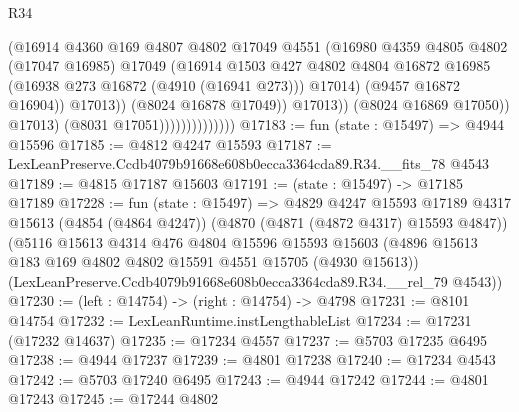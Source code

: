 \begin{lexlean}{R34}
\begin{coremodule}
                                          (@16914
                                            @4360
                                            @169
                                            @4807
                                            @4802
                                            @17049
                                            @4551
                                            (@16980
                                              @4359
                                              @4805
                                              @4802
                                              (@17047 @16985)
                                              @17049
                                              (@16914
                                                @1503
                                                @427
                                                @4802
                                                @4804
                                                @16872
                                                @16985
                                                (@16938 @273 @16872 (@4910 (@16941 @273)))
                                                @17014)
                                              (@9457 @16872 @16904))
                                            @17013))
                                        (@8024 @16878 @17049))
                                      @17013))
                                  (@8024 @16869 @17050))
                                @17013)
                              (@8031 @17051))))))))))))))
@17183 := fun (state : @15497) => @4944 @15596
@17185 := @4812 @4247 @15593
@17187 := LexLeanPreserve.Ccdb4079b91668e608b0ecca3364cda89.R34.__fits_78 @4543
@17189 := @4815 @17187 @15603
@17191 := (state : @15497) -> @17185 @17189
@17228 := fun (state : @15497) =>
  @4829
    @4247
    @15593
    @17189
    @4317
    @15613
    (@4854 (@4864 @4247))
    (@4870 (@4871 (@4872 @4317) @15593 @4847))
    (@5116
      @15613
      @4314
      @476
      @4804
      @15596
      @15593
      @15603
      (@4896 @15613 @183 @169 @4802 @4802 @15591 @4551 @15705 (@4930 @15613))
      (LexLeanPreserve.Ccdb4079b91668e608b0ecca3364cda89.R34.__rel_79 @4543))
@17230 := (left : @14754) -> (right : @14754) -> @4798
@17231 := @8101 @14754
@17232 := LexLeanRuntime.instLengthableList
@17234 := @17231 (@17232 @14637)
@17235 := @17234 @4557
@17237 := @5703 @17235 @6495
@17238 := @4944 @17237
@17239 := @4801 @17238
@17240 := @17234 @4543
@17242 := @5703 @17240 @6495
@17243 := @4944 @17242
@17244 := @4801 @17243
@17245 := @17244 @4802

\end{coremodule}
\end{lexlean}
